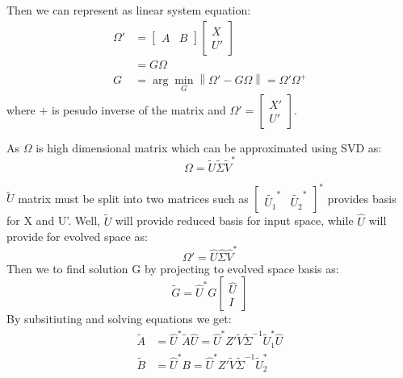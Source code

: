 \documentclass[11pt, reqno, letterpaper, twoside]{amsart}
\theoremstyle{plain}
\theoremstyle{definition}
\begin{document}
Then we can represent as linear system equation:
\begin{equation}
    \begin{split}
        \Omega' &= \begin{bmatrix}
            A & B 
         \end{bmatrix} \begin{bmatrix}
            X \\ U'
         \end{bmatrix} \\
         &= G \Omega \\
         G &= \arg \min_{G} \left \| \Omega' - G\Omega \right \| = \Omega'\Omega^{+}
    \end{split}
\end{equation}
where $+$ is pesudo inverse of the matrix and $\Omega' = \begin{bmatrix}
    X' \\
    U'
\end{bmatrix} $.

As $\Omega$ is high dimensional matrix which can be approximated using SVD as:
\begin{equation}
    \Omega = \tilde{U}\tilde{\Sigma}\tilde{V}^*
\end{equation}

$\tilde{U}$ matrix must be split into two matrices such as $ \begin{bmatrix}
    \tilde{U_1}^* & \tilde{U_2}^*
\end{bmatrix}^*  $ provides basis for X and U'. Well, $\tilde{U}$ will provide reduced basis for input space, while $\hat{U}$ will provide for
evolved space as:
\begin{equation}
    \Omega' = \hat{U}\hat{\Sigma}\hat{V}^*
\end{equation} 
Then we to find solution G by projecting to evolved space basis as:
\begin{equation}
    \tilde{G} = \hat{U}^*G\begin{bmatrix}
        \hat{U} \\ I
    \end{bmatrix}
\end{equation}
By subsitiuting and solving equations we get:
\begin{equation}
    \begin{split}
        \tilde{A} &= \hat{U}^*\tilde{A}\hat{U} = \hat{U}^*Z'\tilde{V}\tilde{\Sigma}^{-1}\tilde{U}_1^*\hat{U} \\
        \tilde{B} &= \hat{U}^*B = \hat{U}^*Z'\tilde{V}\tilde{\Sigma}^{-1}\tilde{U}_2^*
    \end{split}
\end{equation}
\end{document}
